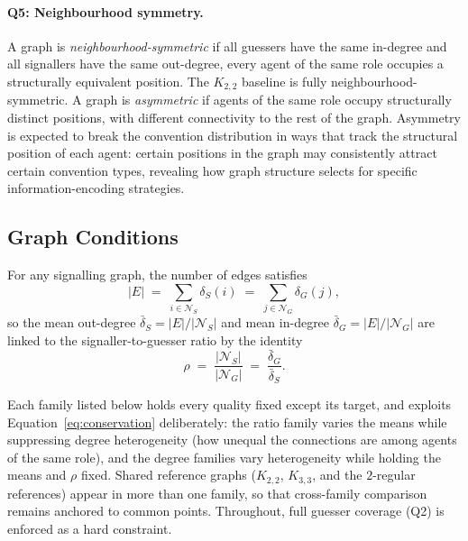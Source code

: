 \documentclass[a4paper,twoside,12pt]{report}
\begin{document}
    \paragraph{Q5: Neighbourhood symmetry.}
    A graph is \emph{neighbourhood-symmetric} if all guessers have the same in-degree
    and all signallers have the same out-degree, every agent of the same role
    occupies a structurally equivalent position. The $K_{2,2}$ baseline is fully
    neighbourhood-symmetric. A graph is \emph{asymmetric} if agents of the same
    role occupy structurally distinct positions, with different connectivity to the
    rest of the graph. Asymmetry is expected to break the convention distribution
    in ways that track the structural position of each agent: certain positions in
    the graph may consistently attract certain convention types, revealing how
    graph structure selects for specific information-encoding strategies.
    
    \subsection{Graph Conditions}
    \label{sec:topconditions}
    
    For any signalling graph, the number of edges satisfies
    \begin{equation}
        |E| \;=\; \sum_{i \in \mathcal{N}_S} \delta_S(i)
              \;=\; \sum_{j \in \mathcal{N}_G} \delta_G(j),
    \end{equation}
    so the mean out-degree $\bar{\delta}_S = |E|/|\mathcal{N}_S|$ and mean
    in-degree $\bar{\delta}_G = |E|/|\mathcal{N}_G|$ are linked to the
    signaller-to-guesser ratio by the identity
    \begin{equation}
        \rho \;=\; \frac{|\mathcal{N}_S|}{|\mathcal{N}_G|}
             \;=\; \frac{\bar{\delta}_G}{\bar{\delta}_S}.
        \label{eq:conservation}
    \end{equation}
    
    Each family listed below holds every quality fixed except its target, and exploits
    Equation~\eqref{eq:conservation} deliberately: the ratio family varies the
    means while suppressing degree heterogeneity (how unequal the connections are among agents of the same role), and the degree families vary
    heterogeneity while holding the means and $\rho$ fixed. Shared reference
    graphs ($K_{2,2}$, $K_{3,3}$, and the $2$-regular references) appear in
    more than one family, so that cross-family comparison remains anchored to
    common points. Throughout, full guesser coverage (Q2) is enforced as a
    hard constraint.
    
\end{document}
